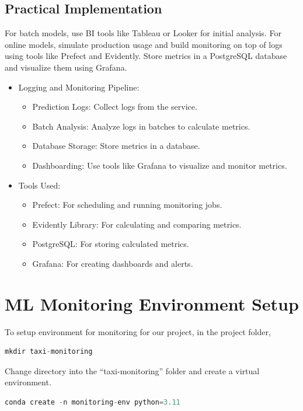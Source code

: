 \documentclass[letterpaper,12pt,notitlepage,twoside]{report}
\begin{document}
\subsection{Practical Implementation}
For batch models, use BI tools like Tableau or Looker for initial analysis. For online models, simulate production usage and build monitoring on top of logs using tools like Prefect and Evidently. Store metrics in a PostgreSQL database and visualize them using Grafana.
\begin{itemize}
    \item Logging and Monitoring Pipeline:
    \begin{itemize}
        \item Prediction Logs: Collect logs from the service.
        \item Batch Analysis: Analyze logs in batches to calculate metrics.
        \item Database Storage: Store metrics in a database.
        \item Dashboarding: Use tools like Grafana to visualize and monitor metrics.
    \end{itemize}
    \item Tools Used:
    \begin{itemize}
        \item Prefect: For scheduling and running monitoring jobs.
        \item Evidently Library: For calculating and comparing metrics.
        \item PostgreSQL: For storing calculated metrics.
        \item Grafana: For creating dashboards and alerts.
    \end{itemize}
\end{itemize}

\section{ML Monitoring Environment Setup}
To setup environment for monitoring for our project, in the project folder,
\begin{lstlisting}[language=python, numbers=none]
 mkdir taxi-monitoring
\end{lstlisting}
Change directory into the ``taxi-monitoring'' folder and create a virtual environment.
\begin{lstlisting}[language=python, numbers=none]
conda create -n monitoring-env python=3.11
\end{lstlisting}
\end{document}
